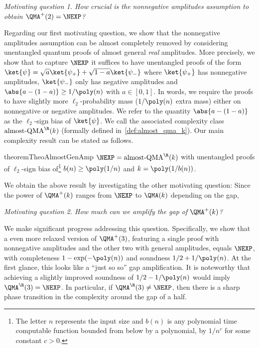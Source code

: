 \begin{center}
{\it  Motivating question 1. How crucial is the nonnegative amplitudes assumption to obtain $\QMA^+(2)=\NEXP$?}
\end{center}
Regarding our first motivating question, we show that the nonnegative amplitudes assumption can be almost
completely removed by considering unentangled quantum proofs of almost general \emph{real} amplitudes.
%
More precisely, we show that to capture $\NEXP$ it suffices to have unentangled proofs of the form
$\ket{\psi} = \sqrt{a} \ket{\psi_+} + \sqrt{1-a} \ket{\psi_{-}}$ where
$\ket{\psi_+}$ has nonnegative amplitudes, $\ket{\psi_{-}}$ only has
negative amplitudes and $\abs{a-(1-a)} \ge 1/\poly(n)$ with $a \in [0,1]$.
%
In words, we require the proofs to have slightly more $\ell_2$-probability mass ($1/\poly(n)$ extra mass) either on
nonnegative or negative amplitudes.
%
We refer to the quantity $\abs{a-(1-a)}$ as the $\ell_2$-sign bias of $\ket{\psi}$.
%
We call the associated complexity class $\textup{almost-QMA}^\R(k)$ (formally defined in~\cref{def:almost_qma_k}).
Our main complexity result can be stated as follows.

\begin{restatable}{theorem}{TheoAlmostGenAmp}\label{thm:almost_gen_amp}
  $\NEXP = \textup{almost-QMA}^\R(k)$ with unentangled proofs of $\ell_2$-sign bias of\footnote{The letter $n$ represents the
  input size and $b(n)$ is any polynomial time computable function bounded from below by a polynomial, \ie by $1/n^c$ for
  some constant $c > 0$.} $b(n) \ge \poly(1/n)$ and $k=\poly(1/b(n))$.
\end{restatable}

We obtain the above result by investigating the other motivating question: Since the power of $\QMA^+(k)$
ranges from $\NEXP$ to $\QMA(k)$ depending on the gap,


\begin{center}{\it Motivating question 2.
  How much can we amplify the gap of $\QMA^+(k)$?}
\end{center}

We make significant progress addressing this question.
%
Specifically, we show that a even more relaxed version of $\QMA^+(3)$, featuring
a single proof with nonnegative amplitudes and the other two with general amplitudes,
equals $\NEXP$, with completeness $1-\exp(-\poly(n))$ and soundness $1/2+1/\poly(n)$.
%
At the first glance, this looks like a ``just so so'' gap amplification.
%
It is noteworthy that achieving a slightly improved soundness of $1/2-1/\poly(n)$ would
imply $\QMA^\R(3)=\NEXP$.
%
In particular, if $\QMA^\R(3) \ne \NEXP$, then there is a sharp phase
transition in the complexity around the gap of a half.

